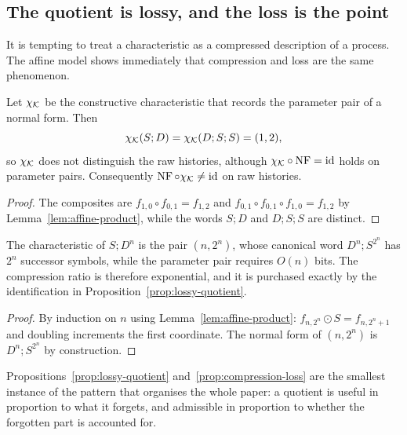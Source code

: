 \subsection{The quotient is lossy, and the loss is the point}

It is tempting to treat a characteristic as a compressed description of a process.
The affine model shows immediately that compression and loss are the same phenomenon.

\begin{proposition}\label{prop:lossy-quotient}
Let $\chi_\mathcal K$ be the constructive characteristic that records the parameter pair of
a normal form.  Then
\[
  \chi_\mathcal K(S;D)=\chi_\mathcal K(D;S;S)=(1,2),
\]
so $\chi_\mathcal K$ does not distinguish the raw histories, although
$\chi_\mathcal K\circ\operatorname{NF}=\operatorname{id}$ holds on parameter pairs.  Consequently
$\operatorname{NF}\circ\chi_\mathcal K\neq\operatorname{id}$ on raw histories.
\end{proposition}

\begin{proof}
The composites are $f_{1,0}\circ f_{0,1}=f_{1,2}$ and
$f_{0,1}\circ f_{0,1}\circ f_{1,0}=f_{1,2}$ by Lemma~\ref{lem:affine-product}, while
the words $S;D$ and $D;S;S$ are distinct.
\end{proof}

\begin{proposition}\label{prop:compression-loss}
The characteristic of $S;D^{n}$ is the pair $(n,2^{n})$, whose canonical word
$D^{n};S^{2^{n}}$ has $2^{n}$ successor symbols, while the parameter pair requires
$O(n)$ bits.  The compression ratio is therefore exponential, and it is purchased
exactly by the identification in Proposition~\ref{prop:lossy-quotient}.
\end{proposition}

\begin{proof}
By induction on $n$ using Lemma~\ref{lem:affine-product}: $f_{n,2^{n}}\odot S=f_{n,2^{n}+1}$
and doubling increments the first coordinate.  The normal form of $(n,2^{n})$ is
$D^{n};S^{2^{n}}$ by construction.
\end{proof}

\begin{remark}
Propositions~\ref{prop:lossy-quotient} and~\ref{prop:compression-loss} are the
smallest instance of the pattern that organises the whole paper: a quotient is
useful in proportion to what it forgets, and admissible in proportion to whether the
forgotten part is accounted for.
\end{remark}

